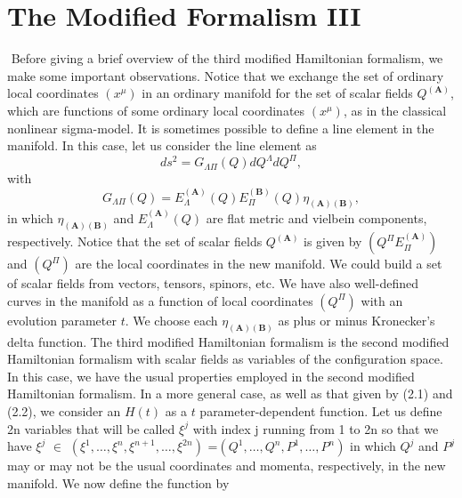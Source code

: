 \section{\bf The Modified Formalism III}
\setcounter{equation}{0}
 $         $
Before giving a brief overview of the third modified Hamiltonian
formalism, we make some important observations. Notice that we exchange
the set of ordinary local coordinates $ (x^{\mu})$ in an ordinary manifold
for the set of scalar fields $Q^{(\mathbf{A})}$, which are functions of some
ordinary local coordinates $ (x^{\mu})$, as in the classical nonlinear sigma-model.
It is sometimes possible to define a line element in the manifold. In this case, let us
consider the line element as
\begin{equation}
 ds^2= G_{\Lambda\Pi}(Q)dQ^{\Lambda}dQ^{\Pi},
\end{equation}
with
\begin{equation}
G_{\Lambda\Pi}(Q)=E_{\Lambda}^{(\mathbf{A})}(Q)E_{\Pi}^{(\mathbf{B})}(Q)\eta_{(\mathbf{A})(\mathbf{B})},
\end{equation}
in which $ \eta_{(\mathbf{A})(\mathbf{B})}$ and $
E_{\Lambda}^{(\mathbf{A})}(Q)$ are flat metric and vielbein
components, respectively. Notice that the set of scalar fields $Q^{(\mathbf{A})}$
is given by $(Q^{\Pi}E_{\Pi}^{(\mathbf{A})})$ and $ (Q^{\Pi})$ are the local coordinates in the
new manifold. We could build a set of scalar fields from vectors, tensors, spinors, etc. We have
also well-defined curves in the manifold as a function of local coordinates $ (Q^{\Pi})$ with an
evolution parameter $ t $.
\newline
We choose each $ \eta_{(\mathbf{A})(\mathbf{B})}$ as plus or minus Kronecker's delta function.
\newline
The third modified Hamiltonian formalism is the second modified Hamiltonian formalism with scalar fields as variables of the
configuration space. In this case, we have the usual properties employed in the second modified
Hamiltonian formalism.
In a more general case, as well as that given by (2.1) and (2.2), we consider an $H({t})$ as a $t$ parameter-dependent function.
Let us define 2n variables that will be called ${\xi}^j$ with index j running from 1 to 2n so that we have
\newline
${\xi}^j$ $\in$ $({\xi}^1,\ldots,{\xi}^n,{\xi}^{n+1},\ldots,{\xi}^{2n})$ =$({Q}^1,\ldots,{Q}^n,{P}^1,\ldots,{P}^n)$
in which ${Q}^j$ and ${P}^j$ may or may not be the usual coordinates and momenta, respectively, in the new manifold.
We now define the function by
